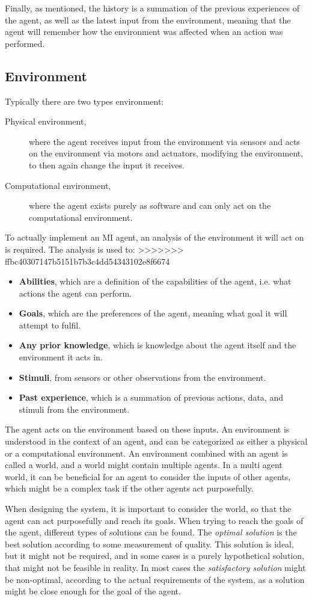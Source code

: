 Finally, as mentioned, the history is a summation of the previous experiences of the agent, as well as the latest input from the environment, meaning that the agent will remember how the environment was affected when an action was performed.

\subsection{Environment}
Typically there are two types environment:
\begin{description}
    \item[Physical environment,]where the agent receives input from the environment via sensors and acts on the environment via motors and actuators, modifying the environment, to then again change the input it receives.
    \item[Computational environment,]where the agent exists purely as software and can only act on the computational environment.
\end{description}
To actually implement an MI agent, an analysis of the environment it will act on is required.
The analysis is used to:
>>>>>>> ffbc40307147b5151b7b3c4dd54343102e8f6674
\begin{itemize}
    \item \textbf{Abilities}, which are a definition of the capabilities of the agent, i{.}e{.} what actions the agent can perform.
    \item \textbf{Goals}, which are the preferences of the agent, meaning what goal it will attempt to fulfil.
    \item \textbf{Any prior knowledge}, which is knowledge about the agent itself and the environment it acts in.
    \item \textbf{Stimuli}, from sensors or other observations from the environment.
    \item \textbf{Past experience}, which is a summation of previous actions, data, and stimuli from the environment.
\end{itemize}

The agent acts on the environment based on these inputs.
An environment is understood in the context of an agent, and can be categorized as either a physical or a computational environment.
An environment combined with an agent is called a world, and a world might contain multiple agents.
In a multi agent world, it can be beneficial for an agent to consider the inputs of other agents, which might be a complex task if the other agents act purposefully.

When designing the system, it is important to consider the world, so that the agent can act purposefully and reach its goals.
When trying to reach the goals of the agent, different types of solutions can be found.
The \textit{optimal solution} is the best solution according to some measurement of quality.
This solution is ideal, but it might not be required, and in some cases is a purely hypothetical solution, that might not be feasible in reality.
In most cases the \textit{satisfactory solution} might be non-optimal, according to the actual requirements of the system, as a solution might be close enough for the goal of the agent.
